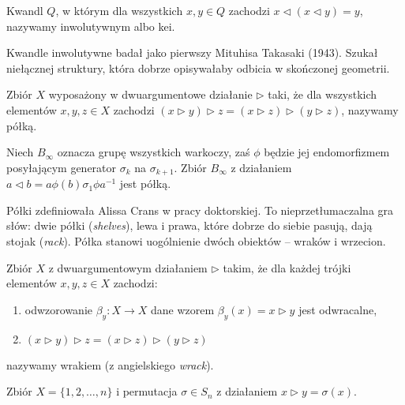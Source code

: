 \begin{definition}
    Kwandl $Q$, w którym dla wszystkich $x, y \in Q$ zachodzi $x \triangleleft (x \triangleleft y) = y$, nazywamy inwolutywnym albo kei.
\end{definition}

Kwandle inwolutywne badał jako pierwszy Mituhisa Takasaki (1943).
Szukał niełącznej struktury, która dobrze opisywałaby odbicia w skończonej geometrii.

\begin{definition}[półka]
    Zbiór $X$ wyposażony w dwuargumentowe działanie $\triangleright$ taki, że dla wszystkich elementów $x, y, z \in X$ zachodzi $(x \triangleright y) \triangleright z = (x \triangleright z) \triangleright (y \triangleright z)$, nazywamy półką.
\end{definition}

\begin{example}
    Niech $B_\infty$ oznacza grupę wszystkich warkoczy, zaś $\phi$ będzie jej endomorfizmem posyłającym generator $\sigma_k$ na $\sigma_{k+1}$.
    Zbiór $B_\infty$ z działaniem $a \triangleleft b = a\phi(b)\sigma_1 \phi{a} ^{-1}$ jest półką.
\end{example}

Półki zdefiniowała Alissa Crans w pracy doktorskiej.
To nieprzetłumaczalna gra słów: dwie półki (\emph{shelves}), lewa i prawa, które dobrze do siebie pasują, dają stojak (\emph{rack}).
Półka stanowi uogólnienie dwóch obiektów -- wraków i wrzecion.

\begin{definition}[wrak]
    Zbiór $X$ z dwuargumentowym działaniem $\triangleright$ takim, że dla każdej trójki elementów $x, y, z \in X$ zachodzi:
    \begin{enumerate}
        \item odwzorowanie $\beta_y \colon X \to X$ dane wzorem $\beta_y(x) = x \triangleright y$ jest odwracalne,
        \item $(x \triangleright y) \triangleright z = (x \triangleright z) \triangleright (y \triangleright z)$
    \end{enumerate}
    nazywamy wrakiem (z angielskiego \emph{wrack}).
\end{definition}

\begin{example}
    Zbiór $X = \{1, 2, \ldots, n\}$ i permutacja $\sigma \in S_n$ z działaniem $x \triangleright y = \sigma(x)$.
\end{example}

